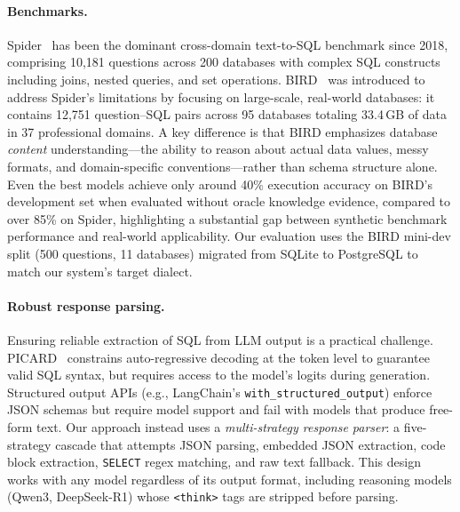 \documentclass{article}
\begin{document}
\paragraph{Benchmarks.}
Spider~\citep{yu2018spider} has been the dominant cross-domain text-to-SQL benchmark since 2018, comprising 10,181 questions across 200 databases with complex SQL constructs including joins, nested queries, and set operations. BIRD~\citep{li2024bird} was introduced to address Spider's limitations by focusing on large-scale, real-world databases: it contains 12,751 question--SQL pairs across 95 databases totaling 33.4\,GB of data in 37 professional domains. A key difference is that BIRD emphasizes database \emph{content} understanding---the ability to reason about actual data values, messy formats, and domain-specific conventions---rather than schema structure alone. Even the best models achieve only around 40\% execution accuracy on BIRD's development set when evaluated without oracle knowledge evidence, compared to over 85\% on Spider, highlighting a substantial gap between synthetic benchmark performance and real-world applicability. Our evaluation uses the BIRD mini-dev split (500 questions, 11 databases) migrated from SQLite to PostgreSQL to match our system's target dialect.

\paragraph{Robust response parsing.}
Ensuring reliable extraction of SQL from LLM output is a practical challenge. PICARD~\citep{scholak2021picard} constrains auto-regressive decoding at the token level to guarantee valid SQL syntax, but requires access to the model's logits during generation. Structured output APIs (e.g., LangChain's \texttt{with\_structured\_output}) enforce JSON schemas but require model support and fail with models that produce free-form text. Our approach instead uses a \emph{multi-strategy response parser}: a five-strategy cascade that attempts JSON parsing, embedded JSON extraction, code block extraction, \texttt{SELECT} regex matching, and raw text fallback. This design works with any model regardless of its output format, including reasoning models (Qwen3, DeepSeek-R1) whose \texttt{<think>} tags are stripped before parsing.
\end{document}
